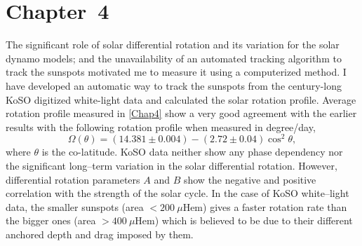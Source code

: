 \section{Chapter~4}

The significant role of solar differential rotation and its variation for the solar dynamo models; and the unavailability of an automated tracking algorithm to track the sunspots motivated me to measure it using a computerized method. I have developed an automatic way to track the sunspots from the century-long KoSO digitized white-light data and calculated the solar rotation profile. Average rotation profile measured in \cref{Chap4} show a very good agreement with the earlier results \citep{Gupta1999} with the following rotation profile when measured in degree/day,
%
\begin{equation}
    \Omega (\theta) = (14.381\pm 0.004)-(2.72\pm0.04)\cos^2{\theta},
\end{equation}
where $\theta$ is the co-latitude. KoSO data neither show any phase dependency nor the significant long--term variation in the solar differential rotation. However, differential rotation parameters $A$ and $B$ show the negative and positive correlation with the strength of the solar cycle. In the case of KoSO white--light data, the smaller sunspots (area $<200~\mu$Hem) gives a faster rotation rate than the bigger ones (area $>400~\mu$Hem) which is believed to be due to their different anchored depth and drag imposed by them. 

